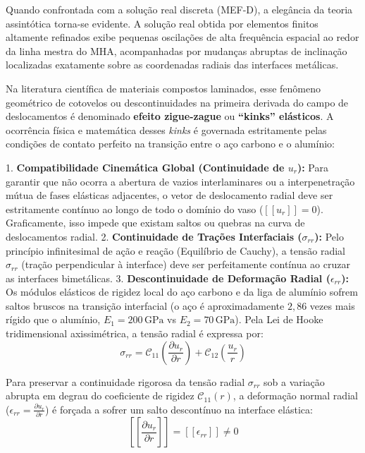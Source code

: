 Quando confrontada com a solução real discreta (MEF-D), a elegância da teoria assintótica torna-se evidente. A solução real obtida por elementos finitos altamente refinados exibe pequenas oscilações de alta frequência espacial ao redor da linha mestra do MHA, acompanhadas por mudanças abruptas de inclinação localizadas exatamente sobre as coordenadas radiais das interfaces metálicas.

Na literatura científica de materiais compostos laminados, esse fenômeno geométrico de cotovelos ou descontinuidades na primeira derivada do campo de deslocamentos é denominado \textbf{efeito zigue-zague} ou \textbf{``kinks'' elásticos}. A ocorrência física e matemática desses \textit{kinks} é governada estritamente pelas condições de contato perfeito na transição entre o aço carbono e o alumínio:

1. \textbf{Compatibilidade Cinemática Global (Continuidade de $u_r$):} Para garantir que não ocorra a abertura de vazios interlaminares ou a interpenetração mútua de fases elásticas adjacentes, o vetor de deslocamento radial deve ser estritamente contínuo ao longo de todo o domínio do vaso ($[[u_r]] = 0$). Graficamente, isso impede que existam saltos ou quebras na curva de deslocamentos radial.
2. \textbf{Continuidade de Trações Interfaciais ($\sigma_{rr}$):} Pelo princípio infinitesimal de ação e reação (Equilíbrio de Cauchy), a tensão radial $\sigma_{rr}$ (tração perpendicular à interface) deve ser perfeitamente contínua ao cruzar as interfaces bimetálicas.
3. \textbf{Descontinuidade de Deformação Radial ($\epsilon_{rr}$):} Os módulos elásticos de rigidez local do aço carbono e da liga de alumínio sofrem saltos bruscos na transição interfacial (o aço é aproximadamente $2,86$ vezes mais rígido que o alumínio, $E_1 = 200 \, \text{GPa}$ vs $E_2 = 70 \, \text{GPa}$). Pela Lei de Hooke tridimensional axissimétrica, a tensão radial é expressa por:
\begin{equation}
  \sigma_{rr} = \mathcal{C}_{11} \left(\frac{\partial u_r}{\partial r}\right) + \mathcal{C}_{12} \left(\frac{u_r}{r}\right)
  \label{eq:hooke_srr_kinks}
\end{equation}

Para preservar a continuidade rigorosa da tensão radial $\sigma_{rr}$ sob a variação abrupta em degrau do coeficiente de rigidez $\mathcal{C}_{11}(r)$, a deformação normal radial ($\epsilon_{rr} = \frac{\partial u_r}{\partial r}$) é forçada a sofrer um salto descontínuo na interface elástica:
\begin{equation}
  \left[\left[ \frac{\partial u_r}{\partial r} \right]\right] = \left[\left[ \epsilon_{rr} \right]\right] \neq 0
  \label{eq:jump_ur_derivative}
\end{equation}

